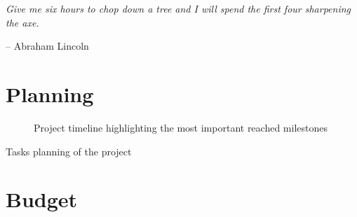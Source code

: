 \epigraph{\textit{Give me six hours to chop down a tree and I will spend the first four sharpening the axe.}}{-- \textup{Abraham Lincoln}}

\section{Planning}

\begin{figure}[ht]
    \centering
    
    \caption{Project timeline highlighting the most important reached milestones}
    \label{fig:timeline}
\end{figure}

\begin{table}[ht]
    \centering
    
    \caption{Tasks planning of the project}
    \label{tab:timeline}
\end{table}

\section{Budget}